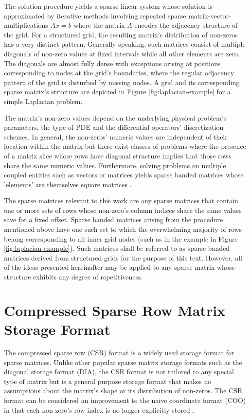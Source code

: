     The solution procedure yields a sparse linear system whose solution is approximated by iterative methods involving
    repeated sparse matrix-vector-multiplications $Ax = b$ where the matrix $A$ encodes the adjacency structure of the
    grid. For a structured grid, the resulting matrix's distribution of non-zeros has a very distinct pattern. Generally
    speaking, such matrices consist of multiple diagonals of non-zero values at fixed intervals while all other elements
    are zero. The diagonals are almost fully dense with exceptions arising at positions corresponding to nodes at the
    grid's boundaries, where the regular adjacency pattern of the grid is disturbed by missing nodes. A grid and its
    corresponding sparse matrix's structure are depicted in Figure \ref{fig:laplacian-example} for a simple Laplacian
    problem.

    The matrix's non-zero values depend on the underlying physical problem's parameters, the type of PDE and the
    differential operators' discretization schemes. In general, the non-zeros' numeric values are independent of their
    location within the matrix but there exist classes of problems where the presence of a matrix slice whose rows
    have diagonal structure implies that those rows share the same numeric values. Furthermore, solving problems on
    multiple coupled entities such as vectors or matrices yields sparse banded matrices whose 'elements' are themselves
    square matrices \cite{Godwin2013}.

    The sparse matrices relevant to this work are any sparse matrices that contain one or more sets of rows whose
    non-zero's column indices share the same values save for a fixed offset. Sparse banded matrices arising from the
    procedure mentioned above have one such set to which the overwhelming majority of rows belong corresponding to all
    inner grid nodes (such as in the example in Figure \ref{fig:laplacian-example}). Such matrices shall be referred to
    as sparse banded matrices derived from structured grids for the purpose of this text. However, all of the ideas
    presented hereinafter may be applied to any sparse matrix whose structure exhibits any degree of repetitiveness.

  \section{Compressed Sparse Row Matrix Storage Format}

    The compressed sparse row (CSR) format is a widely used storage format for sparse matrices. Unlike other popular
    sparse matrix storage formats such as the diagonal storage format (DIA), the CSR format is not tailored to any
    special type of matrix but is a general purpose storage format that makes no assumptions about the matrix's shape or
    its distribution of non-zeros. The CSR format can be considered an improvement to the naive coordinate format (COO)
    in that each non-zero's row index is no longer explicitly stored \cite{Bell2011}.

